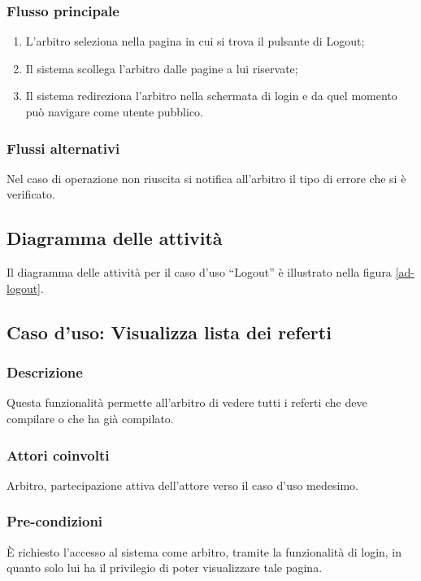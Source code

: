 \subsubsection*{Flusso principale}

\begin{enumerate}
	
	\item
	L'arbitro seleziona nella pagina in cui si trova il pulsante di Logout;
	
	\item
	Il sistema scollega l'arbitro dalle pagine a lui riservate;
	
	\item
	Il sistema redireziona l'arbitro nella schermata di login e da quel momento può navigare come utente pubblico.
	
\end{enumerate}

\subsubsection*{Flussi alternativi}
Nel caso di operazione non riuscita si notifica all'arbitro il tipo di errore che si è verificato.

\subsection*{Diagramma delle attività}
Il diagramma delle attività per il caso d'uso ``Logout'' è illustrato nella figura \vref{ad-logout}.

%
%
\subsection{Caso d'uso: Visualizza lista dei referti}

\subsubsection*{Descrizione}
Questa funzionalità permette all'arbitro di vedere tutti i referti che deve compilare o che ha già compilato.

\subsubsection*{Attori coinvolti}
Arbitro, partecipazione attiva dell'attore verso il caso d'uso medesimo.

\subsubsection*{Pre-condizioni}
È richiesto l'accesso al sistema come arbitro, tramite la funzionalità di login, in quanto solo lui ha il privilegio di poter visualizzare tale pagina.

